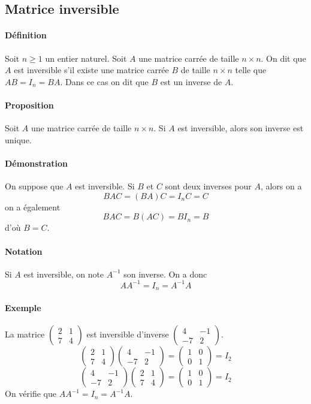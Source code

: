 %
\subsection{Matrice inversible}
%
\paragraph{Définition} Soit $n \geq 1$ un entier naturel. Soit $A$ une matrice carrée de taille $n \times n$. On dit que $A$ est inversible s'il existe une matrice carrée $B$ de taille $n \times n$ telle que $A B = I_n = B A$. Dans ce cas on dit que $B$ est un inverse de $A$.

\paragraph{Proposition} Soit $A$ une matrice carrée de taille $n \times n$. Si $A$ est inversible, alors son inverse est unique.

\paragraph{Démonstration} On suppose que $A$ est inversible. Si $B$ et $C$ sont deux inverses pour $A$, alors on a
$$B A C = (B A) C = I_n C = C$$
on a également
$$B A C = B (A C) = B I_n = B$$
d'où $B = C$.

\paragraph{Notation} Si $A$ est inversible, on note $A^{-1}$ son inverse. On a donc
$$A A^{-1} = I_n = A^{-1} A$$

\paragraph{Exemple} La matrice $\begin{pmatrix} 2 & 1 \\ 7 & 4 \end{pmatrix}$ est inversible d'inverse $\begin{pmatrix} 4 & -1 \\ -7 & 2 \end{pmatrix}$.
$$\begin{pmatrix}2 & 1 \\ 7 & 4 \end{pmatrix} 
  \begin{pmatrix} 4 & -1 \\ -7 & 2 \end{pmatrix} 
  = \begin{pmatrix} 1 & 0 \\ 0 & 1 \end{pmatrix} = I_2$$
$$\begin{pmatrix} 4 & -1 \\ -7 & 2 \end{pmatrix} 
  \begin{pmatrix}2 & 1 \\ 7 & 4 \end{pmatrix}  
  = \begin{pmatrix} 1 & 0 \\ 0 & 1 \end{pmatrix} = I_2$$
On vérifie que $A A^{-1} = I_n = A^{-1} A$.

